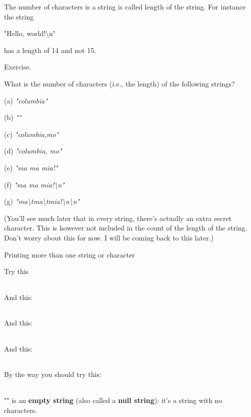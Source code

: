 \documentclass[
]{article}
\begin{document}
The number of characters is a string is called length of the string. For
instance the string

"Hello, world!\textbackslash n"

has a length of 14 and not 15.

Exercise.

What is the number of characters (i.e., the length) of the following
strings?

(a) \emph{"columbia"}

(b) \emph{""}

(c) \emph{"columbia,mo"}

(d) \emph{"columbia, mo"}

(e) \emph{"ma ma mia!"}

(f) \emph{"ma ma mia!\textbackslash n"}

(g)
\emph{"ma\textbackslash tma\textbackslash tmia!\textbackslash n\textbackslash n"}

(You'll see much later that in every string, there's actually an extra
secret character. This is however not included in the count of the
length of the string. Don't worry about this for now. I will be coming
back to this later.)

Printing more than one string or character

Try this

\begin{longtable}[]{@{}@{}}
\toprule
\endhead
\bottomrule
\end{longtable}

And this:

\begin{longtable}[]{@{}@{}}
\toprule
\endhead
\bottomrule
\end{longtable}

And this:

\begin{longtable}[]{@{}@{}}
\toprule
\endhead
\bottomrule
\end{longtable}

And this:

\begin{longtable}[]{@{}@{}}
\toprule
\endhead
\bottomrule
\end{longtable}

By the way you should try this:

\begin{longtable}[]{@{}@{}}
\toprule
\endhead
\bottomrule
\end{longtable}

"" is an \textbf{empty string} (also called a \textbf{null string}):
it's a string with no characters.
\end{document}
